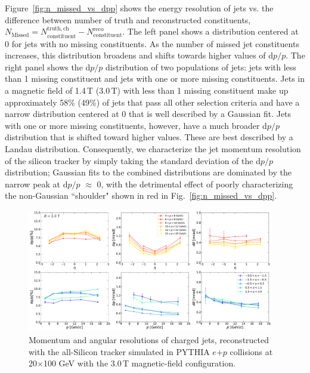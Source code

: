 Figure~\ref{fig:n_missed_vs_dpp} shows the energy resolution of jets vs. the difference between number of truth and reconstructed constituents, $N_\mathrm{Missed} = N_\mathrm{constituent}^\mathrm{truth,ch} - N_\mathrm{constituent}^\mathrm{reco}$. 
The left panel shows a distribution centered at 0 for jets with no missing constituents. As the number of missed jet constituents increases, this distribution broadens and shifts towards higher values of d$p/p$. The right panel shows the d$p/p$ distribution of two populations of jets: jets with less than 1 missing constituent and jets with one or more missing constituents. Jets in a magnetic field of 1.4\,T (3.0\,T) with less than 1 missing constituent make up approximately 58\% (49\%) of jets that pass all other selection criteria and have a narrow distribution centered at 0 that is well described by a Gaussian fit. Jets with one or more missing constituents, however, have a much broader d$p/p$ distribution that is shifted toward higher values. These are best described by a Landau distribution. Consequently, we characterize the jet momentum resolution of the silicon tracker by simply taking the standard deviation of the d$p/p$ distribution; 
Gaussian fits to the combined distributions are dominated by the narrow peak at d$p/p$ $\approx$ 0, with the detrimental effect of poorly characterizing the non-Gaussian ``shoulder" shown in red in Fig.~\ref{fig:n_missed_vs_dpp}.


\begin{figure}[htbp]
    \centering
    \includegraphics[width=0.96\textwidth]{EIC_Jets/DeltaR_B_3.0_resolutions_eta_mom.pdf}
    \caption{Momentum and angular resolutions of charged jets, reconstructed with the all-Silicon tracker simulated in PYTHIA $e$+$p$ collisions at 20$\times$100 GeV with the 3.0\,T magnetic-field configuration.}
    \label{fig:3T_jet_resolutions}
\end{figure}

